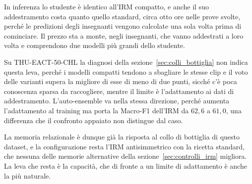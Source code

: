 In inferenza lo studente è identico all'IRM compatto, e anche il suo addestramento costa quanto quello standard, circa otto ore nelle prove svolte, perché le predizioni degli insegnanti vengono calcolate una sola volta prima di cominciare. Il prezzo sta a monte, negli insegnanti, che vanno addestrati a loro volta e comprendono due modelli più grandi dello studente.

Su THU-EACT-50-CHL la diagnosi della sezione~\ref{sec:colli_bottiglia} non indica questa leva, perché i modelli compatti tendono a sbagliare le stesse clip e il voto delle varianti supera la migliore di esse di meno di due punti, sicché c'è poca conoscenza sparsa da raccogliere, mentre il limite è l'adattamento ai dati di addestramento. L'auto-ensemble va nella stessa direzione, perché aumenta l'adattamento al training ma porta la Macro-F1 dell'IRM da $62{,}6$ a $61{,}0$, una differenza che il confronto appaiato non distingue dal caso.

La memoria relazionale è dunque già la risposta al collo di bottiglia di questo dataset, e la configurazione resta l'IRM antisimmetrico con la ricetta standard, che nessuna delle memorie alternative della sezione~\ref{sec:controlli_irm} migliora. La leva che resta è la capacità, che di fronte a un limite di adattamento è anche la più naturale.



